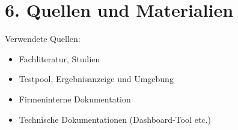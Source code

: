 \section*{6. Quellen und Materialien}
Verwendete Quellen:
\begin{itemize}
    \item Fachliteratur, Studien
    \item Testpool, Ergebnisanzeige und Umgebung
    \item Firmeninterne Dokumentation
    \item Technische Dokumentationen (Dashboard-Tool etc.)
\end{itemize}
